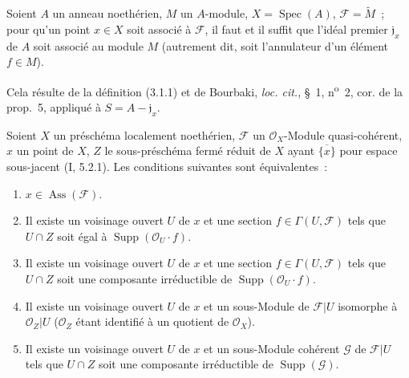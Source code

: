 \begin{proposition}[3.1.2]
\label{IV.2.3.1.2-fr}
Soient $A$ un anneau noethérien, $M$ un $A$-module,
$X=\operatorname{Spec}(A)$, $\mathcal F=\widetilde M$~; pour qu'un point
$x\in X$ soit associé à $\mathcal F$, il faut et il suffit que l'idéal
premier $\mathfrak j_x$ de $A$ soit associé au module $M$ (autrement dit,
soit l'annulateur d'un élément $f\in M$).
\end{proposition}

Cela résulte de la définition (3.1.1) et de Bourbaki, \emph{loc. cit.},
\S~1, n\textsuperscript{o}~2, cor. de la prop.~5, appliqué à
$S=A-\mathfrak j_x$.

\begin{proposition}[3.1.3]
\label{IV.2.3.1.3-fr}
Soient $X$ un préschéma localement noethérien, $\mathcal F$ un
$\mathcal O_X$-Module quasi-cohérent, $x$ un point de $X$, $Z$ le
sous-préschéma fermé réduit de $X$ ayant $\overline{\{x\}}$ pour espace
sous-jacent (I, 5.2.1). Les conditions suivantes sont équivalentes~:
\begin{enumerate}
\item[\emph{a)}] $x\in\operatorname{Ass}(\mathcal F)$.

\item[\emph{b)}] Il existe un voisinage ouvert $U$ de $x$ et une section
$f\in\Gamma(U,\mathcal F)$ tels que $U\cap Z$ soit égal à
$\operatorname{Supp}(\mathcal O_U\cdot f)$.
\item[\emph{b$'$)}] Il existe un voisinage ouvert $U$ de $x$ et une section
$f\in\Gamma(U,\mathcal F)$ tels que $U\cap Z$ soit une composante
irréductible de $\operatorname{Supp}(\mathcal O_U\cdot f)$.
\item[\emph{c)}] Il existe un voisinage ouvert $U$ de $x$ et un sous-Module
de $\mathcal F|U$ isomorphe à $\mathcal O_Z|U$ ($\mathcal O_Z$ étant
identifié à un quotient de $\mathcal O_X$).
\item[\emph{c$'$)}] Il existe un voisinage ouvert $U$ de $x$ et un
sous-Module cohérent $\mathcal G$ de $\mathcal F|U$ tels que $U\cap Z$ soit
une composante irréductible de $\operatorname{Supp}(\mathcal G)$.
\end{enumerate}
\end{proposition}

